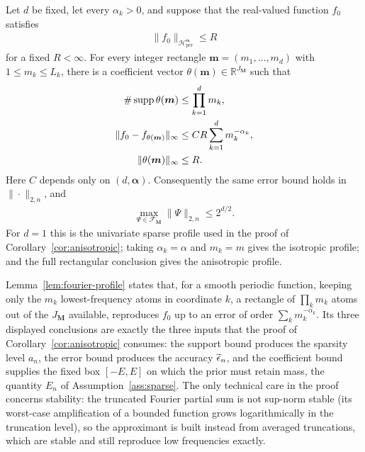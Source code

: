\begin{auxlemma}
\label{lem:fourier-profile}
Let $d$ be fixed, let every $\alpha_k>0$, and suppose that the real-valued function $f_0$ satisfies
\begin{align*}
\|f_0\|_{\mathcal H_{\mathrm{per}}^{\boldsymbol\alpha}}\leq R
\end{align*}
for a fixed $R<\infty$. For every integer rectangle $\boldsymbol m=(m_1,\ldots,m_d)$ with $1\leq m_k\leq L_k$, there is a coefficient vector $\theta(\boldsymbol m)\in\mathbb R^{J_{\boldsymbol M}}$ such that
\begin{align}
\#\operatorname{supp}\theta(\boldsymbol m)
&\leq\prod_{k=1}^dm_k,\notag\\
\|f_0-f_{\theta(\boldsymbol m)}\|_\infty
&\leq CR\sum_{k=1}^dm_k^{-\alpha_k},                       \label{eq:fourier-profile}\\
\|\theta(\boldsymbol m)\|_\infty&\leq R.\notag
\end{align}
Here $C$ depends only on $(d,\boldsymbol\alpha)$. Consequently the same error bound holds in $\|\cdot\|_{2,n}$, and
\begin{align*}
\max_{\Psi\in\mathcal F_{\boldsymbol M}}\|\Psi\|_{2,n}
\leq2^{d/2}.
\end{align*}
For $d=1$ this is the univariate sparse profile used in the proof of Corollary~\ref{cor:anisotropic}; taking $\alpha_k=\alpha$ and $m_k=m$ gives the isotropic profile; and the full rectangular conclusion gives the anisotropic profile.
\end{auxlemma}

Lemma~\ref{lem:fourier-profile} states that, for a smooth periodic function, keeping only the $m_k$ lowest-frequency atoms in coordinate $k$, a rectangle of $\prod_km_k$ atoms out of the $J_{\boldsymbol M}$ available, reproduces $f_0$ up to an error of order $\sum_km_k^{-\alpha_k}$. Its three displayed conclusions are exactly the three inputs that the proof of Corollary~\ref{cor:anisotropic} consumes: the support bound produces the sparsity level $a_n$, the error bound produces the accuracy $\widetilde{\epsilon}_n$, and the coefficient bound supplies the fixed box $[-E,E]$ on which the prior must retain mass, the quantity $E_n$ of Assumption~\ref{ass:sparse}. The only technical care in the proof concerns stability: the truncated Fourier partial sum is not sup-norm stable (its worst-case amplification of a bounded function grows logarithmically in the truncation level), so the approximant is built instead from averaged truncations, which are stable and still reproduce low frequencies exactly.

